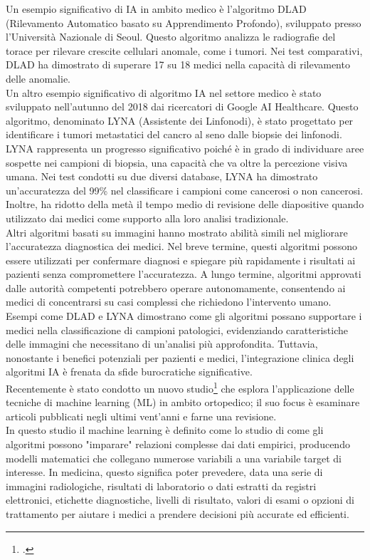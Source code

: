 Un esempio significativo di IA in ambito medico è l'algoritmo DLAD (Rilevamento Automatico basato su Apprendimento Profondo), sviluppato presso l'Università Nazionale di Seoul. Questo algoritmo analizza le radiografie del torace per rilevare crescite cellulari anomale, come i tumori. Nei test comparativi, DLAD ha dimostrato di superare 17 su 18 medici nella capacità di rilevamento delle anomalie.\\
Un altro esempio significativo di algoritmo IA nel settore medico è stato sviluppato nell'autunno del 2018 dai ricercatori di Google AI Healthcare. Questo algoritmo, denominato LYNA (Assistente dei Linfonodi), è stato progettato per identificare i tumori metastatici del cancro al seno dalle biopsie dei linfonodi. LYNA rappresenta un progresso significativo poiché è in grado di individuare aree sospette nei campioni di biopsia, una capacità che va oltre la percezione visiva umana. Nei test condotti su due diversi database, LYNA ha dimostrato un'accuratezza del 99\% nel classificare i campioni come cancerosi o non cancerosi. Inoltre, ha ridotto della metà il tempo medio di revisione delle diapositive quando utilizzato dai medici come supporto alla loro analisi tradizionale.\\
Altri algoritmi basati su immagini hanno mostrato abilità simili nel migliorare l'accuratezza diagnostica dei medici. Nel breve termine, questi algoritmi possono essere utilizzati per confermare diagnosi e spiegare più rapidamente i risultati ai pazienti senza compromettere l'accuratezza. A lungo termine, algoritmi approvati dalle autorità competenti potrebbero operare autonomamente, consentendo ai medici di concentrarsi su casi complessi che richiedono l'intervento umano.\\
Esempi come DLAD e LYNA dimostrano come gli algoritmi possano supportare i medici nella classificazione di campioni patologici, evidenziando caratteristiche delle immagini che necessitano di un'analisi più approfondita. Tuttavia, nonostante i benefici potenziali per pazienti e medici, l'integrazione clinica degli algoritmi IA è frenata da sfide burocratiche significative.\\

Recentemente è stato condotto un nuovo studio\footcite{womak:machine-learning-in-orthopedics} che esplora l'applicazione delle tecniche di machine learning (ML) in ambito ortopedico; il suo focus è esaminare articoli pubblicati negli ultimi vent'anni e farne una revisione.\\
In questo studio il machine learning è definito come lo studio di come gli algoritmi possono "imparare" relazioni complesse dai dati empirici, producendo modelli matematici che collegano numerose variabili a una variabile target di interesse. In medicina, questo significa poter prevedere, data una serie di immagini radiologiche, risultati di laboratorio o dati estratti da registri elettronici, etichette diagnostiche, livelli di risultato, valori di esami o opzioni di trattamento per aiutare i medici a prendere decisioni più accurate ed efficienti.\\

